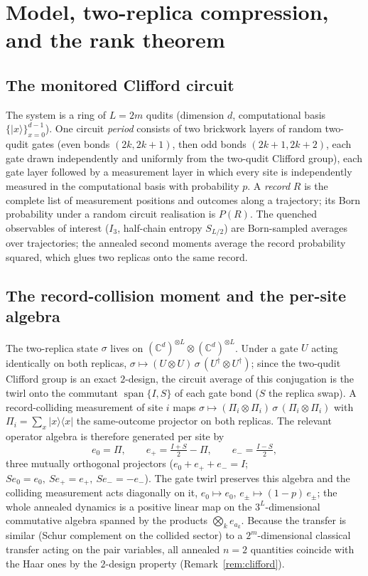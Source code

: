 \documentclass[11pt]{article}
\begin{document}
\section{Model, two-replica compression, and the rank theorem}
\label{sec:model}

\subsection{The monitored Clifford circuit}
\label{sec:circuit}

The system is a ring of $L=2m$ qudits (dimension $d$, computational basis
$\{|x\rangle\}_{x=0}^{d-1}$).  One circuit \emph{period} consists of two
brickwork layers of random two-qudit gates (even bonds $(2k,2k+1)$, then odd
bonds $(2k+1,2k+2)$, each gate drawn independently and uniformly from the
two-qudit Clifford group), each gate layer followed by a measurement layer in
which every site is independently measured in the computational basis with
probability $p$.  A \emph{record} $R$ is the complete list of measurement
positions and outcomes along a trajectory; its Born probability under a
random circuit realisation is $P(R)$.  The quenched observables of interest
($I_3$, half-chain entropy $S_{L/2}$) are Born-sampled averages over
trajectories; the annealed second moments average the record probability
squared, which glues two replicas onto the same record.

\subsection{The record-collision moment and the per-site algebra}
\label{sec:replica}

The two-replica state $\sigma$ lives on
$(\mathbb{C}^d)^{\otimes L}\otimes(\mathbb{C}^d)^{\otimes L}$.  Under a gate
$U$ acting identically on both replicas, $\sigma\mapsto(U\otimes
U)\,\sigma\,(U^\dagger\otimes U^\dagger)$; since the two-qudit Clifford group
is an exact $2$-design, the circuit average of this conjugation is the
twirl onto the commutant $\operatorname{span}\{I,S\}$ of each gate bond ($S$
the replica swap).  A record-colliding measurement of site $i$ maps
$\sigma\mapsto(\Pi_i\otimes\Pi_i)\,\sigma\,(\Pi_i\otimes\Pi_i)$ with
$\Pi_i=\sum_x|x\rangle\langle x|$ the same-outcome projector on both
replicas.  The relevant operator algebra is therefore generated per site by
\begin{equation}
  e_0=\Pi,\qquad e_+=\tfrac{I+S}{2}-\Pi,\qquad e_-=\tfrac{I-S}{2},
  \label{eq:Vdef}
\end{equation}
three mutually orthogonal projectors ($e_0+e_++e_-=I$;
$Se_0=e_0,\ Se_+=e_+,\ Se_-=-e_-$).  The gate twirl preserves this algebra
and the colliding measurement acts diagonally on it,
$e_0\mapsto e_0$, $e_\pm\mapsto(1-p)\,e_\pm$; the whole annealed dynamics is
a positive linear map on the $3^L$-dimensional commutative algebra spanned
by the products $\bigotimes_k e_{a_k}$.  Because the transfer is
similar (Schur complement on the collided sector) to a $2^m$-dimensional
classical transfer acting on the pair variables, all annealed $n=2$
quantities coincide with the Haar ones by the $2$-design property
(Remark~\ref{rem:clifford}).
\end{document}
